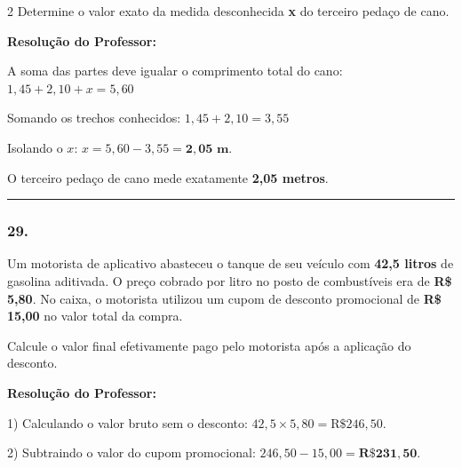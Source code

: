 \begin{multicols*}{2}
Determine o valor exato da medida desconhecida \textbf{x} do terceiro pedaço de cano.

\ifgabarito
    \begin{tcolorbox}[colback=CorTitUm!5, colframe=CorTitUm, boxrule=1pt, arc=4pt, left=6pt, right=6pt, top=6pt, bottom=6pt]
    \small\textbf{\textcolor{CorTitUm}{Resolução do Professor:}}\par\vspace{0.1cm}
    \color{CinzaEscuro}
    A soma das partes deve igualar o comprimento total do cano:
    $1,45 + 2,10 + x = 5,60$
    
    Somando os trechos conhecidos:
    $1,45 + 2,10 = 3,55$
    
    Isolando o $x$:
    $x = 5,60 - 3,55 = \mathbf{2,05\text{ m}}$.
    
    O terceiro pedaço de cano mede exatamente \textbf{2,05 metros}.
    \end{tcolorbox}
\fi

\par\vspace{\espacoQuestao}

\noindent\textcolor{CorLinha}{\rule{\linewidth}{0.5pt}} 
\par\vspace{\espacoPreQuestao}
\subsubsection*{29.} Um motorista de aplicativo abasteceu o tanque de seu veículo com \textbf{42,5 litros} de gasolina aditivada. O preço cobrado por litro no posto de combustíveis era de \textbf{R\$ 5,80}. No caixa, o motorista utilizou um cupom de desconto promocional de \textbf{R\$ 15,00} no valor total da compra.

Calcule o valor final efetivamente pago pelo motorista após a aplicação do desconto.

\ifgabarito
    \begin{tcolorbox}[colback=CorTitUm!5, colframe=CorTitUm, boxrule=1pt, arc=4pt, left=6pt, right=6pt, top=6pt, bottom=6pt]
    \small\textbf{\textcolor{CorTitUm}{Resolução do Professor:}}\par\vspace{0.1cm}
    \color{CinzaEscuro}
    1) Calculando o valor bruto sem o desconto:
    $42,5 \times 5,80 = \text{R\$ } 246,50$.
    
    2) Subtraindo o valor do cupom promocional:
    $246,50 - 15,00 = \mathbf{\text{R\$ } 231,50}$.
    

\end{tcolorbox}
\end{multicols*}
